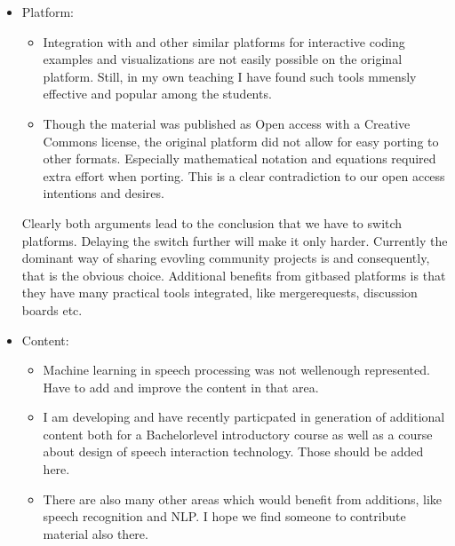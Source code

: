 \documentclass[letterpaper,10pt,english]{jupyterBook}
\begin{document}
\begin{itemize}
\item {} 
\sphinxAtStartPar
Platform:
\begin{itemize}
\item {} 
\sphinxAtStartPar
Integration with  and other similar platforms for interactive coding examples and visualizations are not easily possible on the original platform. Still, in my own teaching I have found such tools mmensly effective and popular among the students.

\item {} 
\sphinxAtStartPar
Though the material was published as Open access with a Creative Commons license, the original platform did not allow for easy porting to other formats. Especially mathematical notation and equations required extra effort when porting. This is a clear contradiction to our open access intentions and desires.

\end{itemize}

\sphinxAtStartPar
Clearly both arguments lead to the conclusion that we have to switch platforms. Delaying the switch further will make it only harder. Currently the dominant way of sharing evovling community projects is  and consequently, that is the obvious choice. Additional benefits from git\sphinxhyphen{}based platforms is that they have many practical tools integrated, like merge\sphinxhyphen{}requests, discussion boards etc.

\item {} 
\sphinxAtStartPar
Content:
\begin{itemize}
\item {} 
\sphinxAtStartPar
Machine learning in speech processing was not well\sphinxhyphen{}enough represented. Have to add and improve the content in that area.

\item {} 
\sphinxAtStartPar
I am developing and have recently particpated in generation of additional content both for a Bachelor\sphinxhyphen{}level introductory course as well as a course about design of speech interaction technology. Those should be added here.

\item {} 
\sphinxAtStartPar
There are also many other areas which would benefit from additions, like speech recognition and NLP. I hope we find someone to contribute material also there.

\end{itemize}

\end{itemize}
\end{document}
